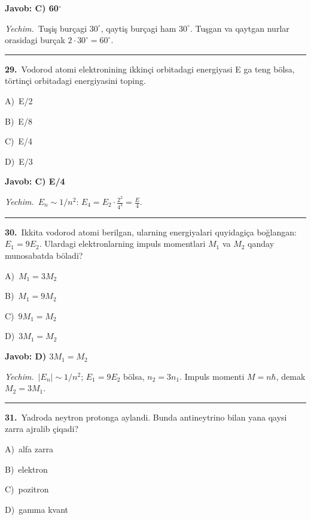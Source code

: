 \documentclass[11pt,a4paper]{article}
\newcommand{\opt}[2]{\hspace*{4mm}#1)\ #2\par}
\begin{document}
\noindent\colorbox{gray!12}{\parbox{\dimexpr\linewidth-2\fboxsep}{\textbf{Javob: C) 60$^\circ$}}}\par\smallskip
\noindent\textit{Yechim.}\ Tuşiş burçagi $30^\circ$, qaytiş burçagi ham $30^\circ$. Tuşgan va qaytgan nurlar orasidagi burçak $2\cdot30^\circ=60^\circ$.\par\par\medskip\hrule\medskip
{}\noindent\begin{minipage}{\linewidth}
\textbf{29.}\ Vodorod atomi elektronining ikkinçi orbitadagi energiyasi E ga teng bölsa, törtinçi orbitadagi energiyasini toping.\par\smallskip
\opt{A}{E/2}
\opt{B}{E/8}
\opt{C}{E/4}
\opt{D}{E/3}
\end{minipage}\vspace{2pt}\par
\noindent\colorbox{gray!12}{\parbox{\dimexpr\linewidth-2\fboxsep}{\textbf{Javob: C) E/4}}}\par\smallskip
\noindent\textit{Yechim.}\ $E_n\sim1/n^2$: $E_4=E_2\cdot\frac{2^2}{4^2}=\frac{E}{4}$.\par\par\medskip\hrule\medskip
{}\noindent\begin{minipage}{\linewidth}
\textbf{30.}\ Ikkita vodorod atomi berilgan, ularning energiyalari quyidagiça boğlangan: $E_1 = 9E_2$. Ulardagi elektronlarning impuls momentlari $M_1$ va $M_2$ qanday munosabatda böladi?\par\smallskip
\opt{A}{$M_1 = 3M_2$}
\opt{B}{$M_1 = 9M_2$}
\opt{C}{$9M_1 = M_2$}
\opt{D}{$3M_1 = M_2$}
\end{minipage}\vspace{2pt}\par
\noindent\colorbox{gray!12}{\parbox{\dimexpr\linewidth-2\fboxsep}{\textbf{Javob: D) $3M_1 = M_2$}}}\par\smallskip
\noindent\textit{Yechim.}\ $|E_n|\sim1/n^2$; $E_1=9E_2$ bölsa, $n_2=3n_1$. Impuls momenti $M=n\hbar$, demak $M_2=3M_1$.\par\par\medskip\hrule\medskip
{}\noindent\begin{minipage}{\linewidth}
\textbf{31.}\ Yadroda neytron protonga aylandi. Bunda antineytrino bilan yana qaysi zarra ajralib çiqadi?\par\smallskip
\opt{A}{alfa zarra}
\opt{B}{elektron}
\opt{C}{pozitron}
\opt{D}{gamma kvant}
\end{minipage}\vspace{2pt}\par
\end{document}
